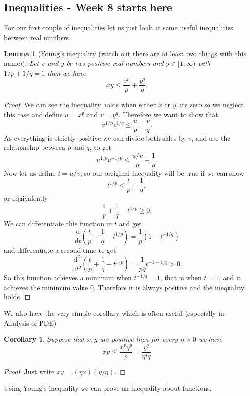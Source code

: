 \documentclass[11pt]{article}
\newtheorem{cor}[thm]{Corollary}
\newtheorem{lem}[thm]{Lemma}
\theoremstyle{definition}
\theoremstyle{remark}
\begin{document}
\subsection{Inequalities - Week 8 starts here}

For our first couple of inequalities let us just look at some useful inequalities between real numbers.
\begin{lem}[Young's inequality (watch out there are at least two things with this name)]
Let $x$ and $y$ be two positive real numbers and $p \in [1, \infty)$ with $1/p +1/q = 1$ then we have
\[ xy \leq \frac{x^p}{p} + \frac{y^q}{q}. \]
\end{lem}
\begin{proof}
We can see the inequality holds when either $x$ or $y$ are zero so we neglect this case and define $u = x^p$ and $v = y^q$. Therefore we want to show that
\[ u^{1/p}v^{1/q} \leq \frac{u}{p} + \frac{v}{q}. \] As everything is strictly positive we can divide both sides by $v$, and use the relationship between $p$ and $q$, to get
\[ u^{1/p}v^{-1/p} \leq \frac{u/v}{p} + \frac{1}{q}. \] Now let us define $t = u/v$, so our orriginal inequality will be true if we can show
\[ t^{1/p} \leq \frac{t}{p} + \frac{1}{q}, \] or equivalently \[ \frac{t}{p} + \frac{1}{q} - t^{1/p} \geq 0. \] We can differentiate this function in $t$ and get
\[ \frac{\mathrm{d}}{\mathrm{d}t} \left(  \frac{t}{p} + \frac{1}{q} - t^{1/p}\right) = \frac{1}{p}(1- t^{-1/q}) \] and differentiate a second time to get
\[  \frac{\mathrm{d}^2}{\mathrm{d}t^2} \left(  \frac{t}{p} + \frac{1}{q} - t^{1/p}\right)  =\frac{1}{pq} t^{-1-1/q} >0.\] So this function achieves a minimum when $t^{-1/q} = 1$, that is when $t=1$, and it achieves the minimum value 0. Therefore it is always positive and the inequality holds. 
\end{proof}
We also have the very simple corollary which is often useful (especially in Analysis of PDE)
\begin{cor}
Suppose that $x,y$ are positive then for every $\eta >0$ we have
\[ xy \leq \frac{x^p \eta^p}{p} + \frac{y^q}{\eta^q q} \]
\end{cor}
\begin{proof}
Just write $xy = (\eta x)(y/\eta)$.
\end{proof}

Using Young's inequality we can prove an inequality about functions.
\end{document}

